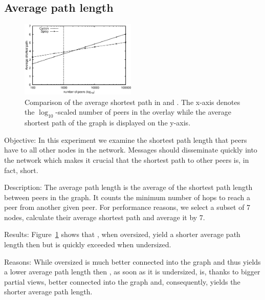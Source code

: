 \subsection{Average path length}
\label{subsec:avg}
\begin{figure}
  \centering
  \includegraphics[width=0.49\textwidth]{img/avgpath.eps}
  \caption{\label{fig:avgpath}Comparison of the average shortest path in \SPRAY{}
      and \CYCLON{}. The x-axis denotes the $\log_{10}$-scaled number of peers in 
      the overlay while the average shortest path of the graph is displayed on the 
  y-axis.}
\end{figure}

\begin{asparadesc}
\item[Objective:] In this experiment we examine the shortest path length that
  peers have to all other nodes in the network.  Messages should disseminate
  quickly into the network which makes it crucial that the shortest path to
  other peers is, in fact, short.
\item[Description:] The average path length is the average of the shortest path
  length between peers in the graph. It counts the minimum number of hops to
  reach a peer from another given peer.  For performance reasons, we select a
  subset of 7 nodes, calculate their average shortest path and average it by 7.
\item[Results:] Figure~\ref{fig:avgpath} shows that \CYCLON{}, when oversized,
  yield a shorter average path length then \SPRAY{} but is quickly exceeded
  when undersized.
\item[Reasons:] While oversized \CYCLON{} is much better connected into the
  graph and thus yields a lower average path length then \SPRAY{}, as soon
  as it is undersized, \SPRAY{} is, thanks to bigger partial views, better
  connected into the graph and, consequently, yields the shorter average path
  length. 
\end{asparadesc}

